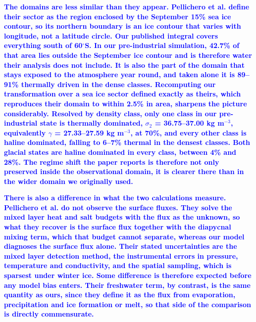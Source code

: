 \documentclass[pdflatex,sn-nature]{sn-jnl}
\begin{document}
\noindent\textcolor{blue}{\textbf{\textbf{The domains are less similar than they appear.} Pellichero et al. define their sector as the region enclosed by the September 15\% sea ice contour, so its northern boundary is an ice contour that varies with longitude, not a latitude circle. Our published integral covers everything south of 60$^\circ$S. In our pre-industrial simulation, 42.7\% of that area lies outside the September ice contour and is therefore water their analysis does not include. It is also the part of the domain that stays exposed to the atmosphere year round, and taken alone it is 89--91\% thermally driven in the dense classes. Recomputing our transformation over a sea ice sector defined exactly as theirs, which reproduces their domain to within 2.5\% in area, sharpens the picture considerably. Resolved by density class, only one class in our pre-industrial state is thermally dominated, $\sigma$$_2$ = 36.75--37.00 kg m$^{-3}$, equivalently $\gamma$ = 27.33--27.59 kg m$^{-3}$, at 70\%, and every other class is haline dominated, falling to 6--7\% thermal in the densest classes. Both glacial states are haline dominated in every class, between 4\% and 28\%. The regime shift the paper reports is therefore not only preserved inside the observational domain, it is clearer there than in the wider domain we originally used.}}


\noindent\textcolor{blue}{\textbf{\textbf{There is also a difference in what the two calculations measure.} Pellichero et al. do not observe the surface fluxes. They solve the mixed layer heat and salt budgets with the flux as the unknown, so what they recover is the surface flux together with the diapycnal mixing term, which that budget cannot separate, whereas our model diagnoses the surface flux alone. Their stated uncertainties are the mixed layer detection method, the instrumental errors in pressure, temperature and conductivity, and the spatial sampling, which is sparsest under winter ice. Some difference is therefore expected before any model bias enters. Their freshwater term, by contrast, is the same quantity as ours, since they define it as the flux from evaporation, precipitation and ice formation or melt, so that side of the comparison is directly commensurate.}}
\end{document}
